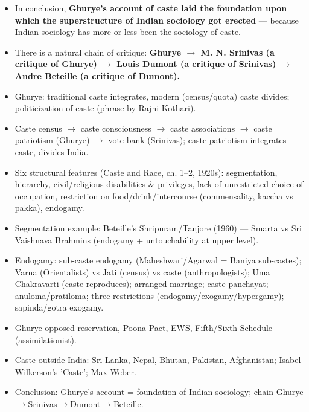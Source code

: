 \begin{KeyConcept}
\begin{itemize}
\item In conclusion, \textbf{Ghurye's account of caste laid the foundation upon which the superstructure of Indian sociology got erected} --- because Indian sociology has more or less been the sociology of caste.
\item There is a natural chain of critique: \textbf{Ghurye $\rightarrow$ M. N. Srinivas (a critique of Ghurye) $\rightarrow$ Louis Dumont (a critique of Srinivas) $\rightarrow$ Andre Beteille (a critique of Dumont).}
\end{itemize}
\end{KeyConcept}

\begin{QuickRevision}
\begin{itemize}
\item Ghurye: traditional caste integrates, modern (census/quota) caste divides; politicization of caste (phrase by Rajni Kothari).
\item Caste census $\rightarrow$ caste consciousness $\rightarrow$ caste associations $\rightarrow$ caste patriotism (Ghurye) $\rightarrow$ vote bank (Srinivas); caste patriotism integrates caste, divides India.
\item Six structural features (Caste and Race, ch. 1--2, 1920s): segmentation, hierarchy, civil/religious disabilities \& privileges, lack of unrestricted choice of occupation, restriction on food/drink/intercourse (commensality, kaccha vs pakka), endogamy.
\item Segmentation example: Beteille's Shripuram/Tanjore (1960) --- Smarta vs Sri Vaishnava Brahmins (endogamy + untouchability at upper level).
\item Endogamy: sub-caste endogamy (Maheshwari/Agarwal = Baniya sub-castes); Varna (Orientalists) vs Jati (census) vs caste (anthropologists); Uma Chakravarti (caste reproduces); arranged marriage; caste panchayat; anuloma/pratiloma; three restrictions (endogamy/exogamy/hypergamy); sapinda/gotra exogamy.
\item Ghurye opposed reservation, Poona Pact, EWS, Fifth/Sixth Schedule (assimilationist).
\item Caste outside India: Sri Lanka, Nepal, Bhutan, Pakistan, Afghanistan; Isabel Wilkerson's 'Caste'; Max Weber.
\item Conclusion: Ghurye's account = foundation of Indian sociology; chain Ghurye$\rightarrow$Srinivas$\rightarrow$Dumont$\rightarrow$Beteille.
\end{itemize}
\end{QuickRevision}

